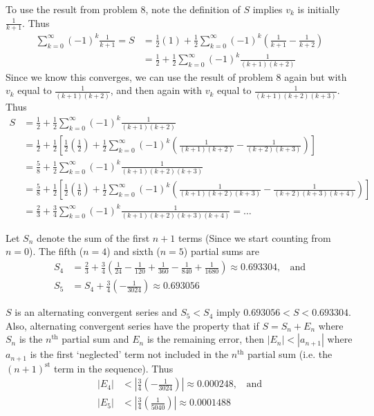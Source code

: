 \documentclass[12pt]{article}
\begin{document}
\noindent To use the result from problem $8$, note the definition of $S$ implies $v_k$ is initially $\frac{1}{k+1}$.  Thus
\begin{align*}
\sum_{k=0}^\infty(-1)^k\frac{1}{k+1} = S &= \frac{1}{2}(1) + \frac{1}{2}\sum_{k=0}^\infty(-1)^k\left(\frac{1}{k+1} - \frac{1}{k+2}\right) \\
&= \frac{1}{2} + \frac{1}{2}\sum_{k=0}^\infty(-1)^k\frac{1}{(k+1)(k+2)}
\end{align*}
Since we know this converges, we can use the result of problem $8$ again but with $v_k$ equal to $\frac{1}{(k+1)(k+2)}$, and then again with $v_k$ equal to $\frac{1}{(k+1)(k+2)(k+3)}$. Thus
\begin{align*}
S &= \frac{1}{2} + \frac{1}{2}\sum_{k=0}^\infty(-1)^k\frac{1}{(k+1)(k+2)} \\
&= \frac{1}{2} + \frac{1}{2}\left[\frac{1}{2}\left(\frac{1}{2}\right) + \frac{1}{2}\sum_{k=0}^\infty(-1)^k\left(\frac{1}{(k+1)(k+2)} - \frac{1}{(k+2)(k+3)}\right)\right] \\
&= \frac{5}{8} + \frac{1}{2}\sum_{k=0}^\infty(-1)^k\frac{1}{(k+1)(k+2)(k+3)} \\
&= \frac{5}{8} + \frac{1}{2}\left[\frac{1}{2}\left(\frac{1}{6}\right) + \frac{1}{2}\sum_{k=0}^\infty(-1)^k\left(\frac{1}{(k+1)(k+2)(k+3)} - \frac{1}{(k+2)(k+3)(k+4)}\right)\right] \\
&= \frac{2}{3} + \frac{3}{4}\sum_{k=0}^\infty(-1)^k\frac{1}{(k+1)(k+2)(k+3)(k+4)} = \dots
\end{align*}

\noindent Let $S_n$ denote the sum of the first $n+1$ terms (Since we start counting from $n=0$).  The fifth ($n=4$) and sixth ($n=5$) partial sums are
\begin{align*}
S_4 &= \frac{2}{3} + \frac{3}{4}\left(\frac{1}{24} - \frac{1}{120} + \frac{1}{360} - \frac{1}{840} + \frac{1}{1680}\right) \approx 0.693304, \ \ \ \ \text{and} \\ 
S_5 &= S_4 + \frac{3}{4}\left(-\frac{1}{3024}\right) \approx 0.693056
\end{align*}

\noindent $S$ is an alternating convergent series and $S_5 < S_4$ imply $0.693056 < S < 0.693304$.  Also, alternating convergent series have the property that if $S = S_n + E_n$ where $S_n$ is the $n^{\text{th}}$ partial sum and $E_n$ is the remaining error, then $|E_n| < |a_{n+1}|$ where $a_{n+1}$ is the first `neglected' term not included in the $n^{\text{th}}$ partial sum (i.e. the $(n + 1)^{\text{st}}$ term in the sequence).  Thus
\begin{align*}
|E_4| &< \left|\frac{3}{4}\left(-\frac{1}{3024}\right)\right| \approx 0.000248, \ \ \ \ \text{and} \\ 
|E_5| &< \left|\frac{3}{4}\left(\frac{1}{5040}\right)\right| \approx 0.0001488
\end{align*}
\end{document}
